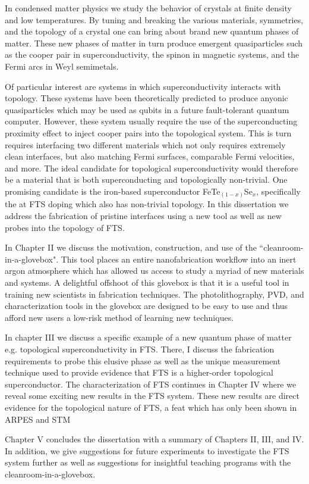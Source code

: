 In condensed matter physics we study the behavior of crystals at finite density and low temperatures. By tuning and breaking the various materials, symmetries, and the topology of a crystal one can bring about brand new quantum phases of matter. These new phases of matter in turn produce emergent quasiparticles such as the cooper pair in superconductivity, the spinon in magnetic systems, and the Fermi arcs in Weyl semimetals. \par
Of particular interest are systems in which superconductivity interacts with topology. These systems have been theoretically predicted to produce anyonic quasiparticles which may be used as qubits in a future fault-tolerant quantum computer. However, these system usually require the use of the superconducting proximity effect to inject cooper pairs into the topological system. This is turn requires interfacing two different materials which not only requires extremely clean interfaces, but also matching Fermi surfaces, comparable Fermi velocities, and more. The ideal candidate for topological superconductivity would therefore be a material that is both superconducting and topologically non-trivial. One promising candidate is the iron-based superconductor FeTe$_{(1-x)}$Se$_{x}$, specifically the at \ac{FTS} doping  which also has non-trivial topology. In this dissertation we address the fabrication of pristine interfaces using a new tool as well as new probes into the topology of \ac{FTS}.\par
In Chapter II we discuss the motivation, construction, and use of the ``cleanroom-in-a-glovebox". 
This tool places an entire nanofabrication workflow into an inert argon atmosphere which has allowed us access to study a myriad of new materials and systems. A delightful offshoot of this glovebox is that it is a useful tool in training new scientists in fabrication techniques. The photolithography, \ac{PVD}, and characterization tools in the glovebox are designed to be easy to use and thus afford new users a low-risk method of learning new techniques.\par
In chapter III we discuss a specific example of a new quantum phase of matter e.g. topological superconductivity in FTS. There, I discuss the fabrication requirements to probe this elusive phase as well as the unique measurement technique used to provide evidence that FTS is a higher-order topological superconductor. The characterization of FTS continues in Chapter IV where we reveal some exciting new results in the \ac{FTS} system. These new results are direct evidence for the topological nature of \ac{FTS}, a feat which has only been shown in \ac{ARPES} and \ac{STM}\par
Chapter V concludes the dissertation with a summary of Chapters II, III, and IV. In addition, we give suggestions for future experiments to investigate the FTS system further as well as suggestions for insightful teaching programs with the cleanroom-in-a-glovebox.